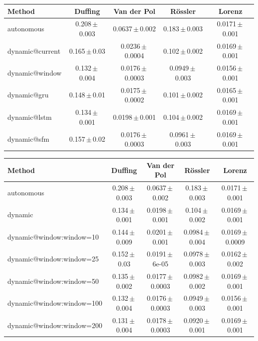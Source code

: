 \begin{tabular}{lcccc}
\toprule
Method & Duffing & Van der Pol & R\"ossler & Lorenz \\
\midrule
autonomous & 0.208\,$\pm$\,0.003 & 0.0637\,$\pm$\,0.002 & 0.183\,$\pm$\,0.003 & 0.0171\,$\pm$\,0.001 \\
dynamic@current & 0.165\,$\pm$\,0.03 & 0.0236\,$\pm$\,0.0004 & 0.102\,$\pm$\,0.002 & 0.0169\,$\pm$\,0.001 \\
dynamic@window & 0.132\,$\pm$\,0.004 & 0.0176\,$\pm$\,0.0003 & 0.0949\,$\pm$\,0.003 & 0.0156\,$\pm$\,0.001 \\
dynamic@gru & 0.148\,$\pm$\,0.01 & 0.0175\,$\pm$\,0.0002 & 0.101\,$\pm$\,0.002 & 0.0165\,$\pm$\,0.001 \\
dynamic@lstm & 0.134\,$\pm$\,0.001 & 0.0198\,$\pm$\,0.001 & 0.104\,$\pm$\,0.002 & 0.0169\,$\pm$\,0.001 \\
dynamic@sfm & 0.157\,$\pm$\,0.02 & 0.0176\,$\pm$\,0.0003 & 0.0961\,$\pm$\,0.003 & 0.0169\,$\pm$\,0.001 \\
\bottomrule
\end{tabular}

\begin{tabular}{lcccc}
\toprule
Method & Duffing & Van der Pol & R\"ossler & Lorenz \\
\midrule
autonomous & 0.208\,$\pm$\,0.003 & 0.0637\,$\pm$\,0.002 & 0.183\,$\pm$\,0.003 & 0.0171\,$\pm$\,0.001 \\
dynamic & 0.134\,$\pm$\,0.001 & 0.0198\,$\pm$\,0.001 & 0.104\,$\pm$\,0.002 & 0.0169\,$\pm$\,0.001 \\
dynamic@window:window=10 & 0.144\,$\pm$\,0.009 & 0.0201\,$\pm$\,0.001 & 0.0984\,$\pm$\,0.004 & 0.0169\,$\pm$\,0.0009 \\
dynamic@window:window=25 & 0.152\,$\pm$\,0.03 & 0.0191\,$\pm$\,6e-05 & 0.0978\,$\pm$\,0.003 & 0.0162\,$\pm$\,0.002 \\
dynamic@window:window=50 & 0.135\,$\pm$\,0.002 & 0.0177\,$\pm$\,0.0003 & 0.0982\,$\pm$\,0.002 & 0.0169\,$\pm$\,0.001 \\
dynamic@window:window=100 & 0.132\,$\pm$\,0.004 & 0.0176\,$\pm$\,0.0003 & 0.0949\,$\pm$\,0.003 & 0.0156\,$\pm$\,0.001 \\
dynamic@window:window=200 & 0.131\,$\pm$\,0.004 & 0.0178\,$\pm$\,0.0003 & 0.0920\,$\pm$\,0.001 & 0.0169\,$\pm$\,0.001 \\
\bottomrule
\end{tabular}


